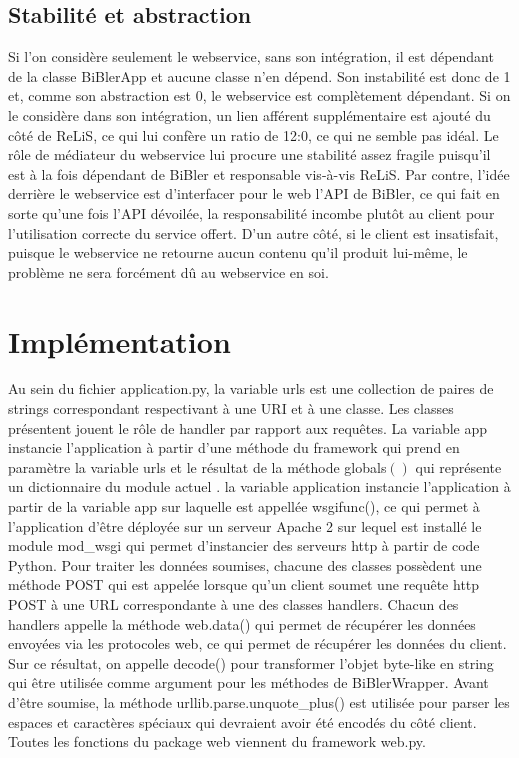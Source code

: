 \documentclass[12pt,titlepage]{article}
\let\oldsection\section
\renewcommand\section{\clearpage\oldsection}
\begin{document}
\subsection{Stabilité et abstraction}
Si l'on considère seulement le webservice, sans son intégration, il est dépendant de la classe BiBlerApp et aucune classe n'en dépend. Son instabilité est donc de 1 et, comme son abstraction est 0, le webservice est complètement dépendant. Si on le considère dans son intégration, un lien afférent supplémentaire est ajouté du côté de ReLiS, ce qui lui confère un ratio de 1\/2:0, ce qui ne semble pas idéal. Le rôle de médiateur du webservice lui procure une stabilité assez fragile puisqu'il est à la fois dépendant de BiBler et responsable vis-à-vis ReLiS. Par contre, l'idée derrière le webservice est d'interfacer pour le web l'API de BiBler, ce qui fait en sorte qu'une fois l'API dévoilée, la responsabilité incombe plutôt au client pour l'utilisation correcte du service offert. D'un autre côté, si le client est insatisfait, puisque le webservice ne retourne aucun contenu qu'il produit lui-même, le problème ne sera forcément dû au webservice en soi. \newline


\section{Implémentation}
Au sein du fichier application.py,  la variable urls est une collection de paires de strings correspondant respectivant à une URI et à une classe. Les classes présentent jouent le rôle de handler par rapport aux requêtes. La variable app instancie l'application à partir d'une méthode du framework qui prend en paramètre la variable urls et le résultat de la méthode globals$()$ qui représente un dictionnaire du module actuel \cite{PDa}. la variable application instancie l'application à partir de la variable app sur laquelle est appellée wsgifunc(), ce qui permet à l'application d'être déployée sur un serveur Apache 2 sur lequel est installé le module mod\_wsgi qui permet d'instancier des serveurs http à partir de code Python. Pour traiter les données soumises, chacune des classes possèdent une méthode POST qui est appelée lorsque qu'un client soumet une requête http POST à une URL correspondante à une des classes handlers. Chacun des handlers appelle la méthode web.data() qui permet de récupérer les données envoyées via les protocoles web, ce qui permet de récupérer les données du client. Sur ce résultat, on appelle decode() pour transformer l'objet byte-like en string qui être utilisée comme argument pour les méthodes de BiBlerWrapper. Avant d'être soumise, la méthode urllib.parse.unquote\_plus() est utilisée pour parser les espaces et caractères spéciaux qui devraient avoir été encodés du côté client. Toutes les fonctions du package web viennent du framework web.py. \newline
\end{document}
